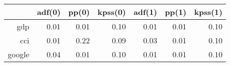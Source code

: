 \begin{table}[ht]
\centering
\begin{tabular}{rrrrrrr}
  \hline
 & adf(0) & pp(0) & kpss(0) & adf(1) & pp(1) & kpss(1) \\ 
  \hline
gdp & 0.01 & 0.01 & 0.10 & 0.01 & 0.01 & 0.10 \\ 
  cci & 0.01 & 0.22 & 0.09 & 0.03 & 0.01 & 0.10 \\ 
  google & 0.04 & 0.01 & 0.10 & 0.01 & 0.01 & 0.10 \\ 
   \hline
\end{tabular}
\end{table}
